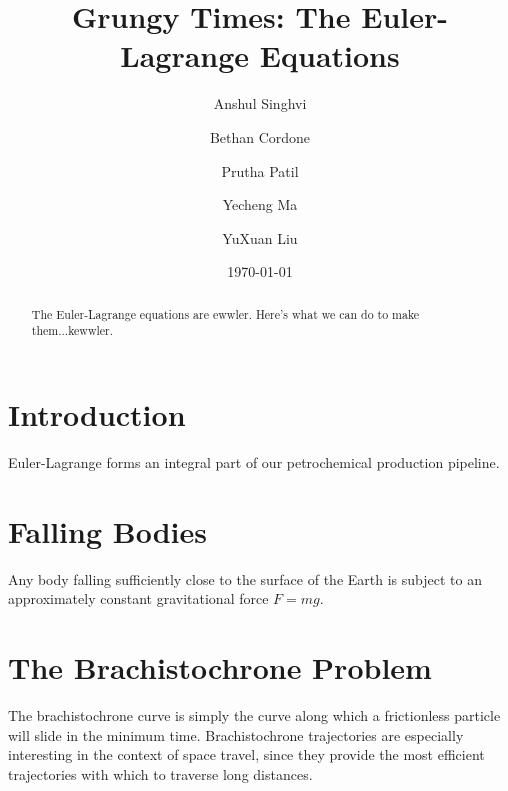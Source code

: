 \documentclass[%
 preprint,
 amsmath,amssymb,
 aps,
 pra,
 fleqn
]{revtex4-2}
\begin{document}

\title{Grungy Times: The Euler-Lagrange Equations}

\author{Anshul Singhvi}
\author{Bethan Cordone}
\author{Prutha Patil}%
\author{Yecheng Ma}
\author{YuXuan Liu}

%

\date{\today}%

\begin{abstract}
    The Euler-Lagrange equations are ewwler.  Here's what we can do to make them...kewwler.
\end{abstract}

\maketitle

\section{Introduction}
Euler-Lagrange forms an integral part of our petrochemical production pipeline.

\section{Falling Bodies} %

Any body falling sufficiently close to the surface of the Earth is subject to an approximately constant gravitational force $F = mg$.

\section{The Brachistochrone Problem} %

The brachistochrone curve is simply the curve along which a frictionless particle will slide in the minimum time.  Brachistochrone trajectories are especially interesting in the context of space travel, since they provide the most efficient trajectories with which to traverse long distances.
\end{document}
